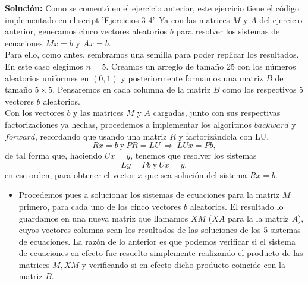 \documentclass[letterpaper]{article}
\newcommand{\ent}{\Longrightarrow}
\newcommand{\1}{\mathds{1}}
\theoremstyle{definition}
\theoremstyle{definition}
\theoremstyle{definition}
\theoremstyle{definition}
\theoremstyle{definition}
\begin{document}
\begin{enumerate}
    \textbf{Solución:} Como se comentó en el ejercicio anterior, este ejercicio tiene
    el código implementado en el script 'Ejercicios 3-4'. Ya con las matrices $M$ y $A$
    del ejercicio anterior, generamos cinco vectores aleatorios $b$ para resolver los
    sistemas de ecuaciones $Mx=b$ y $Ax=b$.\\

    Para ello, como antes, sembramos una semilla para poder replicar los resultados.
    En este caso elegimos $n=5$. Creamos un arreglo de tamaño 25 con los números aleatorios
    uniformes en $(0,1)$ y posteriormente formamos una matriz $B$ de tamaño $5\times5$.
    Pensaremos en cada columna de la matriz $B$ como los respectivos 5 vectores $b$ aleatorios.\\

    Con los vectores $b$ y las matrices $M$ y $A$ cargadas, junto con sus respectivas 
    factorizaciones ya hechas, procedemos a implementar los algoritmos $backward$ y
    $forward$, recordando que usando una matriz $R$ y factorizándola con LU, 
    \[
    Rx=b \ \text{y} \ PR=LU \ \ent \ LUx=Pb,    
    \]
    de tal forma que, haciendo $Ux=y$, tenemos que resolver los sistemas
    \[
        Ly=Pb \ \text{y} \ Ux=y,
    \]
    en ese orden, para obtener el vector $x$ que sea solución del sistema $Rx=b$. 
    
    \begin{itemize}
    \item   Procedemos pues a solucionar los sistemas de ecuaciones para la matriz $M$ primero,
    para cada uno de los cinco vectores $b$ aleatorios. El resultado lo guardamos en una nueva matriz que llamamos
    $XM$ ($XA$ para la la matriz $A$), cuyos vectores columna sean los resultados de las soluciones de los 5 sistemas
    de ecuaciones. La razón de lo anterior es que podemos verificar si
    el sistema de ecuaciones en efecto fue resuelto simplemente realizando el producto de las
    matrices $M,XM$ y verificando si en efecto dicho producto coincide con la matriz $B$.
    \newline


\end{itemize}
\end{enumerate}
\end{document}
